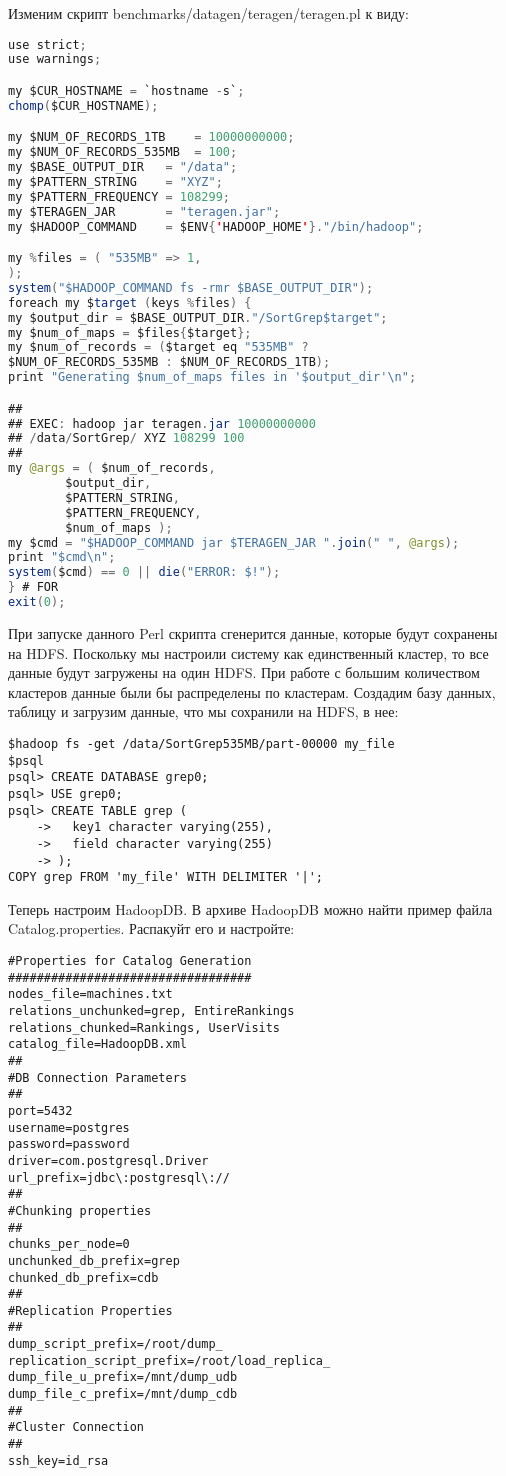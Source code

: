 Изменим скрипт benchmarks/datagen/teragen/teragen.pl к виду:
\begin{lstlisting}[language=Java,label=lst:haddop20,caption=Тестирование]
use strict;
use warnings;

my $CUR_HOSTNAME = `hostname -s`;
chomp($CUR_HOSTNAME);

my $NUM_OF_RECORDS_1TB    = 10000000000;
my $NUM_OF_RECORDS_535MB  = 100;
my $BASE_OUTPUT_DIR   = "/data";
my $PATTERN_STRING    = "XYZ";
my $PATTERN_FREQUENCY = 108299;
my $TERAGEN_JAR       = "teragen.jar";
my $HADOOP_COMMAND    = $ENV{'HADOOP_HOME'}."/bin/hadoop";

my %files = ( "535MB" => 1,
);
system("$HADOOP_COMMAND fs -rmr $BASE_OUTPUT_DIR");
foreach my $target (keys %files) {
my $output_dir = $BASE_OUTPUT_DIR."/SortGrep$target";
my $num_of_maps = $files{$target};
my $num_of_records = ($target eq "535MB" ? 
$NUM_OF_RECORDS_535MB : $NUM_OF_RECORDS_1TB);
print "Generating $num_of_maps files in '$output_dir'\n";

##
## EXEC: hadoop jar teragen.jar 10000000000 
## /data/SortGrep/ XYZ 108299 100
##
my @args = ( $num_of_records,
	    $output_dir,
	    $PATTERN_STRING,
	    $PATTERN_FREQUENCY,
	    $num_of_maps );
my $cmd = "$HADOOP_COMMAND jar $TERAGEN_JAR ".join(" ", @args);
print "$cmd\n";
system($cmd) == 0 || die("ERROR: $!");
} # FOR
exit(0);
\end{lstlisting}

При запуске данного Perl скрипта сгенерится данные, которые будут сохранены на HDFS. 
Поскольку мы настроили систему как единственный кластер, то все данные будут загружены на один HDFS. 
При работе с большим количеством кластеров данные были бы распределены по кластерам.
Создадим базу данных, таблицу и загрузим данные, что мы сохранили на HDFS, в нее:
\begin{lstlisting}[label=lst:haddop21,caption=Тестирование]
$hadoop fs -get /data/SortGrep535MB/part-00000 my_file
$psql
psql> CREATE DATABASE grep0;
psql> USE grep0;
psql> CREATE TABLE grep (
    ->   key1 character varying(255),
    ->   field character varying(255)
    -> );
COPY grep FROM 'my_file' WITH DELIMITER '|';
\end{lstlisting}

Теперь настроим HadoopDB. В архиве HadoopDB можно найти пример файла Catalog.properties. Распакуйт его и настройте:
\begin{lstlisting}[label=lst:haddop22,caption=Тестирование]
#Properties for Catalog Generation
##################################
nodes_file=machines.txt
relations_unchunked=grep, EntireRankings
relations_chunked=Rankings, UserVisits
catalog_file=HadoopDB.xml
##
#DB Connection Parameters
##
port=5432
username=postgres
password=password
driver=com.postgresql.Driver
url_prefix=jdbc\:postgresql\://
##
#Chunking properties
##
chunks_per_node=0
unchunked_db_prefix=grep
chunked_db_prefix=cdb
##
#Replication Properties
##
dump_script_prefix=/root/dump_
replication_script_prefix=/root/load_replica_
dump_file_u_prefix=/mnt/dump_udb
dump_file_c_prefix=/mnt/dump_cdb
##
#Cluster Connection
##
ssh_key=id_rsa
\end{lstlisting}

